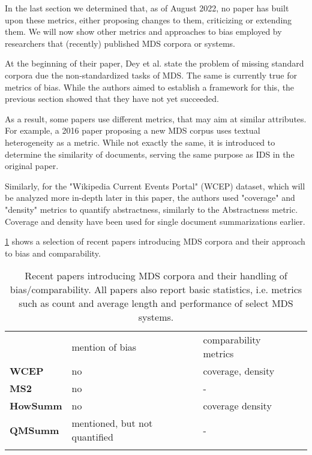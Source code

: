 \documentclass[../main.tex]{subfiles}
\begin{document}
In the last section we determined that, as of August 2022, no paper has built upon these metrics, either proposing changes to them, criticizing or extending them.
We will now show other metrics and approaches to bias employed by researchers that (recently) published MDS corpora or systems.

At the beginning of their paper, Dey et al. state the problem of missing standard corpora due the non-standardized tasks of MDS.
The same is currently true for metrics of bias.
While the authors aimed to establish a framework for this, the previous section showed that they have not yet succeeded.

As a result, some papers use different metrics, that may aim at similar attributes.
For example, a 2016 paper proposing a new MDS corpus uses textual heterogeneity as a metric. \cite{zopf_maxime_peyrard_eckle-kohler_2016}
While not exactly the same, it is introduced to determine the similarity of documents, serving the same purpose as IDS in the original paper.

Similarly, for the "Wikipedia Current Events Portal" (WCEP) dataset,
which will be analyzed more in-depth later in this paper, the authors used "coverage" and "density" metrics to quantify abstractness,
similarly to the Abstractness metric.\cite{WCEP-gholipour-ghalandari-etal-2020-large}
Coverage and density have been used for single document summarizations earlier.\cite{grusky-etal-2018-newsroom}


\ref{tab:status-quo} shows a selection of recent papers introducing MDS corpora and their approach to bias and comparability.

\begin{table}
    \centering
    \begin{tabular}{l|lll}
                                                                                 & mention of bias               & comparability metrics & \\
        \cline{1-3}
        \textbf{WCEP}\cite{WCEP-gholipour-ghalandari-etal-2020-large}            & no                            & coverage, density     & \\
        \textbf{MS2}\cite{MS2-https://doi.org/10.48550/arxiv.2104.06486}         & no                            & -                     & \\
        \textbf{HowSumm}\cite{wikihow-https://doi.org/10.48550/arxiv.2110.03179} & no                            & coverage  density     & \\
        \textbf{QMSumm}\cite{qmsum-https://doi.org/10.48550/arxiv.2104.05938}    & mentioned, but not quantified & -                     & \\
        \multicolumn{1}{l}{}                                                     &                               &                       &
    \end{tabular}

    \caption{Recent papers introducing MDS corpora and their handling of bias/comparability. All papers also report basic statistics, i.e. metrics such as count and average length and performance of select MDS systems.}
    \label{tab:status-quo}
\end{table}
\end{document}
